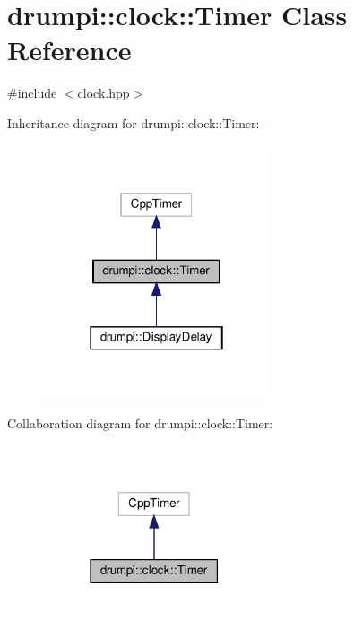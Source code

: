 \hypertarget{classdrumpi_1_1clock_1_1Timer}{}\section{drumpi\+:\+:clock\+:\+:Timer Class Reference}
\label{classdrumpi_1_1clock_1_1Timer}


{\ttfamily \#include $<$clock.\+hpp$>$}



Inheritance diagram for drumpi\+:\+:clock\+:\+:Timer\+:
\nopagebreak
\begin{figure}[H]
\begin{center}
\leavevmode
\includegraphics[width=190pt]{classdrumpi_1_1clock_1_1Timer__inherit__graph}
\end{center}
\end{figure}


Collaboration diagram for drumpi\+:\+:clock\+:\+:Timer\+:
\nopagebreak
\begin{figure}[H]
\begin{center}
\leavevmode
\includegraphics[width=186pt]{classdrumpi_1_1clock_1_1Timer__coll__graph}
\end{center}
\end{figure}
